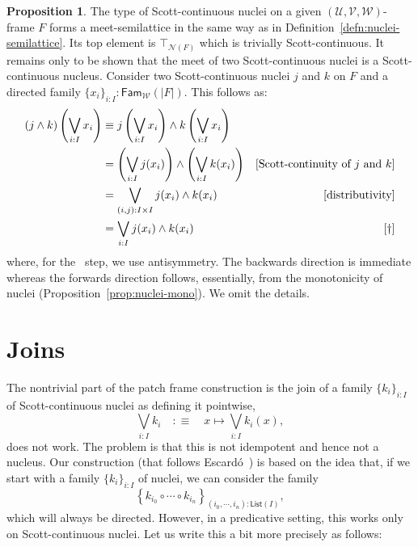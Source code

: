 \documentclass[a4paper, 11pt]{article}
\theoremstyle{definition}
\newtheorem{prop}{Proposition}
\newcommand{\paren}[1]{\left( #1 \right)}
\newcommand{\UU}{\mathcal{U}}
\newcommand{\VV}{\mathcal{V}}
\newcommand{\WW}{\mathcal{W}}
\begin{document}
\begin{prop}\label{prop:sc-nuclei-semilattice}
  The type of Scott-continuous nuclei on a given $(\UU, \VV, \WW)$-frame $F$ forms a
  meet-semilattice in the same way as in Definition~\ref{defn:nuclei-semilattice}. Its top element
  is $\top_{\mathcal{N}(F)}$ which is trivially Scott-continuous. It remains only to be shown that the
  meet of two Scott-continuous nuclei is a Scott-continuous nucleus. Consider two Scott-continuous
  nuclei $j$ and $k$ on $F$ and a directed family $\{ x_i \}_{i : I} : \mathsf{Fam}_{\WW}(| F |)$.
  This follows as:
  \begin{align*}
    (j \wedge k) \left( \bigvee_{i : I} x_i \right)
    &\equiv j \left( \bigvee_{i : I} x_i \right) \wedge k \left( \bigvee_{i : I} x_i \right) & \\
    &= \paren{ \bigvee_{i : I} j(x_i) } \wedge \paren{ \bigvee_{i : I} k(x_i) } & [\text{Scott-continuity of $j$ and $k$}]\\
    &= \bigvee_{(i, j) : I \times I} j(x_i) \wedge k(x_i) & [\text{distributivity}]\\
    &= \bigvee_{i : I} j(x_i) \wedge k(x_i) & [\text{\dag}]
  \end{align*}
  where, for the \dag\ step, we use antisymmetry. The backwards direction is immediate whereas the
  forwards direction follows, essentially, from the monotonicity of nuclei
  (Proposition~\ref{prop:nuclei-mono}). We omit the details.
\end{prop}

\section{Joins}

The nontrivial part of the patch frame construction is the join of a family $\{ k_i \}_{i : I}$ of
Scott-continuous nuclei as defining it pointwise,
\begin{equation*}
  \bigvee_{i : I} k_i \quad:\equiv\quad x \mapsto \bigvee_{i : I} k_i(x),
\end{equation*}
does not work. The problem is that this is not idempotent and hence not a nucleus. Our construction
(that follows Escard\'{o}~\cite{properly-injective}) is based on the idea that, if we start with a
family $\{ k_i \}_{i : I}$ of nuclei, we can consider the family
\begin{equation*}
  \left\{ k_{i_0} \circ \cdots \circ k_{i_n} \right\}_{(i_0, \cdots, i_n) : \mathsf{List}(I)},
\end{equation*}
which will always be directed. However, in a predicative setting, this works only on
Scott-continuous nuclei. Let us write this a bit more precisely as follows:
\end{document}
